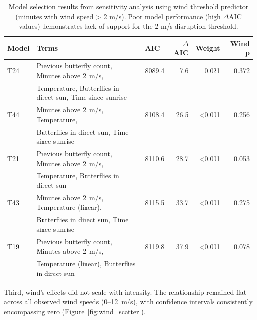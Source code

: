 \begin{table}[htbp]
\centering
\caption{Model selection results from sensitivity analysis using wind threshold predictor (minutes with wind speed > 2 m/s). Poor model performance (high $\Delta$AIC values) demonstrates lack of support for the 2 m/s disruption threshold.}
\label{tab:threshold_model_selection}
\begin{tabular}{lllrrr}
\hline
Model & Terms & AIC & $\Delta$AIC & Weight & Wind p \\
\hline
T24 & Previous butterfly count, Minutes above 2~m/s, & 8089.4 & 7.6 & 0.021 & 0.372 \\
    & Temperature, Butterflies in direct sun, Time since sunrise & & & & \\
T44 & Minutes above 2~m/s, Temperature, & 8108.4 & 26.5 & <0.001 & 0.256 \\
    & Butterflies in direct sun, Time since sunrise & & & & \\
T21 & Previous butterfly count, Minutes above 2~m/s, & 8110.6 & 28.7 & <0.001 & 0.053 \\
    & Temperature, Butterflies in direct sun & & & & \\
T43 & Minutes above 2~m/s, Temperature (linear), & 8115.5 & 33.7 & <0.001 & 0.275 \\
    & Butterflies in direct sun, Time since sunrise & & & & \\
T19 & Previous butterfly count, Minutes above 2~m/s, & 8119.8 & 37.9 & <0.001 & 0.078 \\
    & Temperature (linear), Butterflies in direct sun & & & & \\
\hline
\end{tabular}
\end{table}

Third, wind's effects did not scale with intensity. The relationship remained flat across all observed wind speeds (0–12~m/s), with confidence intervals consistently encompassing zero (Figure~\ref{fig:wind_scatter}).

